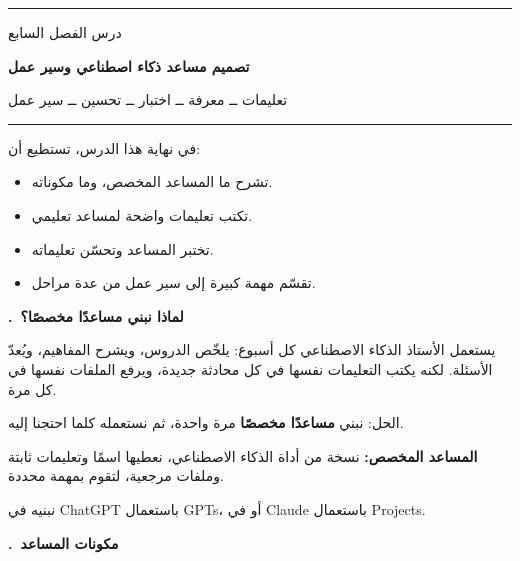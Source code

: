 \documentclass[a4paper]{article}
\newcounter{qism}
\newcommand{\qism}[1]{%
    \stepcounter{qism}%
    \par\bigskip
    {\large\khatt\bfseries{\color{asasi}\arabic{qism}.}\ {\color{dakin}#1}}\par
    \vspace{-2pt}{\color{black!20}\rule{\linewidth}{0.6pt}}\par\nopagebreak[4]
    \smallskip}
\newcommand{\kalima}[2][]{\textbf{#2}}
\newcommand{\unwan}[3]{%
    \begin{center}
        {\color{asasi}\rule{\linewidth}{1.2pt}}\par\medskip
        {\khatt\color{ramadi} #1}\par\smallskip
        {\Large\khatt\bfseries\color{dakin} #2}\par\smallskip
        {\khatt\color{ramadi} #3}\par\medskip
        {\color{asasi}\rule{\linewidth}{1.2pt}}
    \end{center}}
\begin{document}

\unwan{درس الفصل السابع}
{تصميم مساعد ذكاء اصطناعي وسير عمل}
{تعليمات ــ معرفة ــ اختبار ــ تحسين ــ سير عمل}

\begin{ahdaf}
في نهاية هذا الدرس، تستطيع أن:
\begin{itemize}
    \item تشرح ما المساعد المخصص، وما مكوناته.
    \item تكتب تعليمات واضحة لمساعد تعليمي.
    \item تختبر المساعد وتحسّن تعليماته.
    \item تقسّم مهمة كبيرة إلى سير عمل من عدة مراحل.
\end{itemize}
\end{ahdaf}

\qism{لماذا نبني مساعدًا مخصصًا؟}

يستعمل الأستاذ الذكاء الاصطناعي كل أسبوع: يلخّص الدروس، ويشرح المفاهيم، ويُعدّ الأسئلة.
لكنه يكتب التعليمات نفسها في كل محادثة جديدة، ويرفع الملفات نفسها في كل مرة.

الحل: نبني \kalima{مساعدًا مخصصًا} مرة واحدة، ثم نستعمله كلما احتجنا إليه.

\begin{taarif}
\textbf{المساعد المخصص:} نسخة من أداة الذكاء الاصطناعي،
نعطيها اسمًا وتعليمات ثابتة وملفات مرجعية، لتقوم بمهمة محددة.
\end{taarif}

نبنيه في \textenglish{ChatGPT} باستعمال \textenglish{GPTs}،
أو في \textenglish{Claude} باستعمال \textenglish{Projects}.

\qism{مكونات المساعد}

\begin{center}
\end{center}
\end{document}
